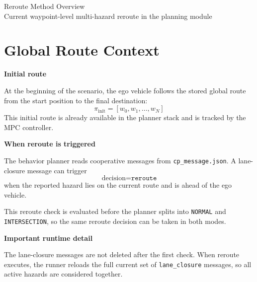 \documentclass[11pt]{article}
\begin{document}
\begin{center}
{\LARGE Reroute Method Overview}\\[0.35em]
{\large Current waypoint-level multi-hazard reroute in the planning module}
\end{center}

\section*{Global Route Context}
\begin{minipage}[t]{0.59\textwidth}
\textbf{Initial route}

At the beginning of the scenario, the ego vehicle follows the stored global route from the start position to the final destination:
\[
\pi_{\mathrm{init}} = [w_0,w_1,\ldots,w_N]
\]
This initial route is already available in the planner stack and is tracked by the MPC controller.

\textbf{When reroute is triggered}

The behavior planner reads cooperative messages from \texttt{cp\_message.json}. A lane-closure message can trigger
\[
\text{decision}=\texttt{reroute}
\]
when the reported hazard lies on the current route and is ahead of the ego vehicle.

This reroute check is evaluated before the planner splits into \texttt{NORMAL} and \texttt{INTERSECTION}, so the same reroute decision can be taken in both modes.

\textbf{Important runtime detail}

The lane-closure messages are not deleted after the first check. When reroute executes, the runner reloads the full current set of \texttt{lane\_closure} messages, so all active hazards are considered together.
\end{minipage}
\hfill
\end{document}
